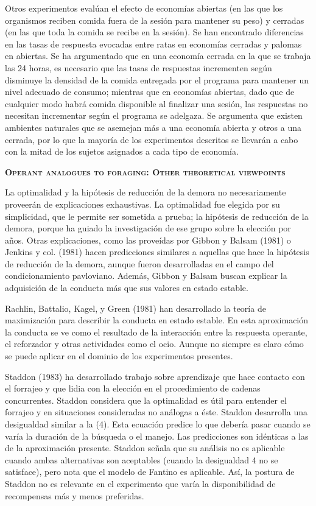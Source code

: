 \documentclass[a4paper,12pt]{article}
\begin{document}
Otros experimentos evalúan el efecto de economías abiertas (en las que los organismos reciben comida fuera de la sesión para mantener su peso) y cerradas (en las que toda la comida se recibe en la sesión). Se han encontrado diferencias en las tasas de respuesta evocadas entre ratas en economías cerradas y palomas en abiertas. Se ha argumentado que en una economía cerrada en la que se trabaja las 24 horas, es necesario que las tasas de respuestas incrementen según disminuye la densidad de la comida entregada por el programa para mantener un nivel adecuado de consumo; mientras que en economías abiertas, dado que de cualquier modo habrá comida disponible al finalizar una sesión, las respuestas no necesitan incrementar según el programa se adelgaza. Se argumenta que existen ambientes naturales que se asemejan más a una economía abierta y otros a una cerrada, por lo que la mayoría de los experimentos descritos se llevarán a cabo con la mitad de los sujetos asignados a cada tipo de economía.

{\scshape\bfseries Operant analogues to foraging: Other theoretical viewpoints}

La optimalidad y la hipótesis de reducción de la demora no necesariamente proveerán de explicaciones exhaustivas. La optimalidad fue elegida por su simplicidad, que le permite ser sometida a prueba; la hipótesis de reducción de la demora, porque ha guiado la investigación de ese grupo sobre la elección por años. Otras explicaciones, como las proveídas por Gibbon y Balsam (1981) o Jenkins y col. (1981) hacen predicciones similares a aquellas que hace la hipótesis de reducción de la demora, aunque fueron desarrolladas en el campo del condicionamiento pavloviano. Además, Gibbon y Balsam buscan explicar la adquisición de la conducta más que sus valores en estado estable.

Rachlin, Battalio, Kagel, y Green (1981) han desarrollado la teoría de maximización para describir la conducta en estado estable. En esta aproximación la conducta se ve como el resultado de la interacción entre la respuesta operante, el reforzador y otras actividades como el ocio. Aunque no siempre es claro cómo se puede aplicar en el dominio de los experimentos presentes.

Staddon (1983) ha desarrollado trabajo sobre aprendizaje que hace contacto con el forrajeo y que lidia con la elección en el procedimiento de cadenas concurrentes. Staddon considera que la optimalidad es útil para entender el forrajeo y en situaciones consideradas no análogas a éste. Staddon desarrolla una desigualdad similar a la (4). Esta ecuación predice lo que debería pasar cuando se varía la duración de la búsqueda o el manejo. Las predicciones son idénticas a las de la aproximación presente. Staddon señala que su análisis no es aplicable cuando ambas alternativas son aceptables (cuando la desigualdad 4 no se satisface), pero nota que el modelo de Fantino es aplicable. Así, la postura de Staddon no es relevante en el experimento que varía la disponibilidad de recompensas más y menos preferidas.
\end{document}
